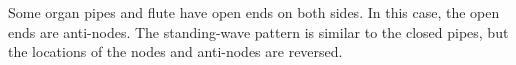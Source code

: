 Some organ pipes and flute have open ends on both sides. In this case, the
open ends are anti-nodes. The standing-wave pattern is similar to the closed
pipes, but the locations of the nodes and anti-nodes are reversed.
%  
%
%
%
%



